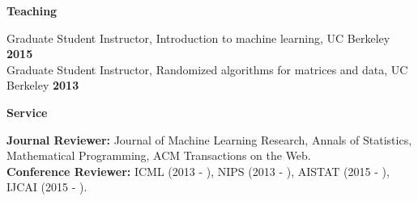 \documentclass{res}
\begin{document}
\begin{resume}
{\Large\bf Teaching}

\vspace{-5pt}
Graduate Student Instructor, Introduction to machine learning, UC Berkeley \hfill\textbf{2015}\\
Graduate Student Instructor, Randomized algorithms for matrices and data, UC Berkeley \hfill\textbf{2013}

{\Large\bf Service}

\vspace{-5pt}
{\bf Journal Reviewer:} Journal of Machine Learning Research, Annals of Statistics, Mathematical Programming, ACM Transactions on the Web. \\
{\bf Conference Reviewer:} ICML (2013 - ), NIPS (2013 - ), AISTAT (2015 - ), IJCAI (2015 - ).

\end{resume}
\end{document}
